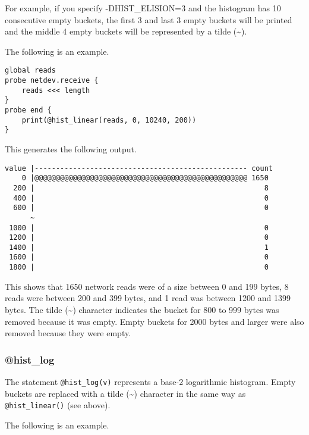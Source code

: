 \documentclass[twoside,english]{article}
\newenvironment{vindent}
{\begin{list}{}{\setlength{\listparindent}{6pt}}
\item[]}
{\end{list}}
\begin{document}
For example, if you specify -DHIST\_ELISION=3 and the histogram has 10
consecutive empty buckets, the first 3 and last 3 empty buckets will
be printed and the middle 4 empty buckets will be represented by a
tilde (\textasciitilde{}).

The following is an example.

\begin{vindent}
\begin{verbatim}
global reads
probe netdev.receive {
    reads <<< length
}
probe end {
    print(@hist_linear(reads, 0, 10240, 200))
}
\end{verbatim}
\end{vindent}
This generates the following output.

\begin{samepage}
\begin{vindent}
\begin{verbatim}
value |-------------------------------------------------- count
    0 |@@@@@@@@@@@@@@@@@@@@@@@@@@@@@@@@@@@@@@@@@@@@@@@@@@ 1650
  200 |                                                      8
  400 |                                                      0
  600 |                                                      0
      ~
 1000 |                                                      0
 1200 |                                                      0
 1400 |                                                      1
 1600 |                                                      0
 1800 |                                                      0
\end{verbatim}
\end{vindent}
\end{samepage}
This shows that 1650 network reads were of a size between 0 and 199 bytes,
8 reads were between 200 and 399 bytes, and 1 read was between
1200 and 1399 bytes.  The tilde (\textasciitilde{}) character indicates
the bucket for 800 to 999 bytes was removed because it was empty.
Empty buckets for 2000 bytes and larger were also removed because they
were empty.

\subsubsection{@hist\_log}
The statement \texttt{@hist\_log(v)} represents a base-2 logarithmic
histogram.  Empty buckets are replaced with a tilde (\textasciitilde{})
character in the same way as \texttt{@hist\_linear()} (see above).

The following is an example.
\end{document}
